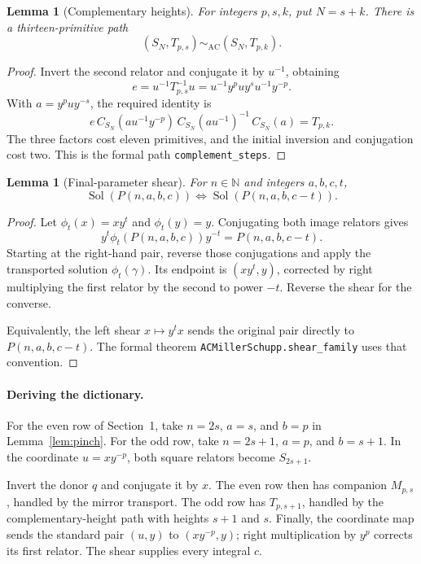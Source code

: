 \documentclass[11pt]{article}
\newtheorem{lemma}[theorem]{Lemma}
\theoremstyle{definition}\newtheorem{definition}[theorem]{Definition}
\theoremstyle{remark}\newtheorem{remark}[theorem]{Remark}
\newcommand{\Sol}{\operatorname{Sol}}
\newcommand{\AC}{\mathrel{\sim_{\mathrm{AC}}}}
\begin{document}
\begin{lemma}[Complementary heights]\label{lem:complement}
For integers $p,s,k$, put $N=s+k$. There is a thirteen-primitive path
\[
(S_N,T_{p,s})\AC(S_N,T_{p,k}).
\]
\end{lemma}
\begin{proof}
Invert the second relator and conjugate it by $u^{-1}$, obtaining
\[
e=u^{-1}T_{p,s}^{-1}u=u^{-1}y^puy^su^{-1}y^{-p}.
\]
With $a=y^puy^{-s}$, the required identity is
\[
e\,C_{S_N}(au^{-1}y^{-p})\,C_{S_N}(au^{-1})^{-1}\,C_{S_N}(a)=T_{p,k}.
\]
The three factors cost eleven primitives, and the initial inversion and conjugation cost two. This is the formal path \texttt{complement\_steps}.
\end{proof}

\begin{lemma}[Final-parameter shear]\label{lem:shear}
For $n\in\mathbb N$ and integers $a,b,c,t$,
\[
\Sol(P(n,a,b,c))\iff\Sol(P(n,a,b,c-t)).
\]
\end{lemma}
\begin{proof}
Let $\phi_t(x)=xy^t$ and $\phi_t(y)=y$. Conjugating both image relators gives
\[
y^t\phi_t(P(n,a,b,c))y^{-t}=P(n,a,b,c-t).
\]
Starting at the right-hand pair, reverse those conjugations and apply the transported solution $\phi_t(\gamma)$. Its endpoint is $(xy^t,y)$, corrected by right multiplying the first relator by the second to power $-t$. Reverse the shear for the converse.

Equivalently, the left shear $x\mapsto y^tx$ sends the original pair directly to $P(n,a,b,c-t)$. The formal theorem \texttt{ACMillerSchupp.shear\_family} uses that convention.
\end{proof}

\paragraph{Deriving the dictionary.}
For the even row of Section~1, take $n=2s$, $a=s$, and $b=p$ in Lemma~\ref{lem:pinch}. For the odd row, take $n=2s+1$, $a=p$, and $b=s+1$. In the coordinate $u=xy^{-p}$, both square relators become $S_{2s+1}$.

Invert the donor $q$ and conjugate it by $x$. The even row then has companion $M_{p,s}$, handled by the mirror transport. The odd row has $T_{p,s+1}$, handled by the complementary-height path with heights $s+1$ and $s$. Finally, the coordinate map sends the standard pair $(u,y)$ to $(xy^{-p},y)$; right multiplication by $y^p$ corrects its first relator. The shear supplies every integral $c$.
\end{document}
